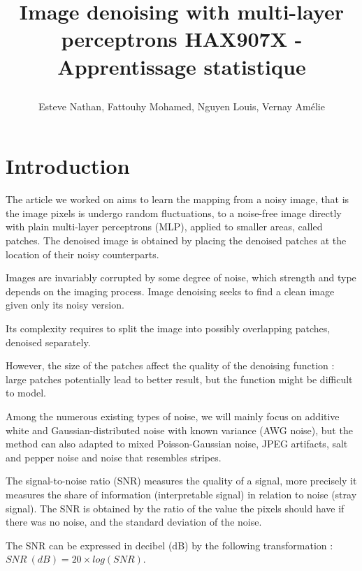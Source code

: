 \documentclass[10pt,a4paper]{article}
\author{Esteve Nathan, Fattouhy Mohamed, Nguyen Louis, Vernay Amélie}
\title{%
    \begin{minipage}\linewidth
        \centering
        Image denoising with multi-layer perceptrons
        \vskip3pt
        \large 
        HAX907X - Apprentissage statistique
    \end{minipage}
}
\newcommand{\svs}{\vspace{9pt}}
\begin{document}
\maketitle
\section{Introduction}

The article we worked on \cite{denoise} aims to learn the mapping from a noisy image, that is the image pixels is undergo random fluctuations, to a noise-free image directly with plain multi-layer perceptrons (MLP), applied to smaller areas, called patches. The denoised image is obtained by placing the denoised patches at the location of their noisy counterparts.

\svs

Images are invariably corrupted by some degree of noise, which strength and type depends on the imaging process. Image denoising seeks to find a clean image given only its noisy version.

\svs

Its complexity requires to split the image into possibly overlapping patches, denoised separately.

\svs

However, the size of the patches affect the quality of the denoising function : large patches potentially lead to better result, but the function might be difficult to model.

\svs

Among the numerous existing types of noise, we will mainly focus on additive white and Gaussian-distributed noise with known variance (AWG noise), but the method can also adapted to mixed Poisson-Gaussian noise, JPEG artifacts, salt and pepper noise and noise that resembles stripes.

\svs

The signal-to-noise ratio (SNR) measures the quality of a signal, more precisely it measures the share of information (interpretable signal) in relation to noise (stray signal).
The SNR is obtained by the ratio of the value the pixels should have if there was no noise, and the standard deviation of the noise.

\svs

The SNR can be expressed in decibel (dB) by the following transformation : $SNR \ (dB) = 20 \times log(SNR)$.
\end{document}
